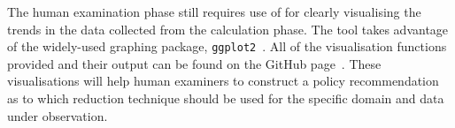 The human examination phase still requires use of \mr for clearly visualising the trends in the data
collected from the calculation phase. The \mr tool takes advantage of the widely-used graphing package, \texttt{ggplot2}~\cite{ggplot2}.
All of the visualisation functions provided and their output can be found on the GitHub page~\cite{mrstudyr}.
These visualisations will help human examiners to construct a policy recommendation as to which reduction technique
should be used for the specific domain and data under observation.
